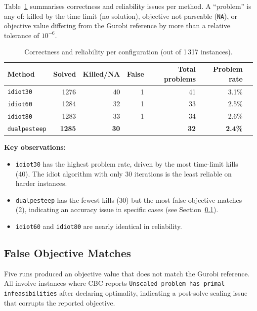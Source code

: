 \documentclass[11pt,a4paper]{article}
\newcommand{\best}[1]{\cellcolor{bestcell}\textbf{#1}}
\newcommand{\bad}[1]{\cellcolor{badcell}{#1}}
\begin{document}
Table~\ref{tab:problems} summarises correctness and reliability issues per method.
A ``problem'' is any of: killed by the time limit (no solution), objective not
parseable (\texttt{NA}), or objective value differing from the Gurobi reference
by more than a relative tolerance of $10^{-6}$.

\begin{table}[h]
\centering
\caption{Correctness and reliability per configuration (out of 1\,317 instances).}
\label{tab:problems}
\begin{tabular}{lrrrrrr}
\toprule
\textbf{Method} & \textbf{Solved} & \textbf{Killed/NA} & \textbf{False} &
\textbf{Total problems} & \textbf{Problem rate} \\
\midrule
\texttt{idiot30}     & 1276 & 40 & 1 & 41 & 3.1\% \\
\texttt{idiot60}     & 1284 & 32 & 1 & 33 & 2.5\% \\
\texttt{idiot80}     & 1283 & 33 & 1 & 34 & 2.6\% \\
\texttt{dualpesteep} & \best{1285} & \best{30} & \bad{2} & \best{32} & \best{2.4\%} \\
\bottomrule
\end{tabular}
\end{table}

\noindent \textbf{Key observations:}
\begin{itemize}
  \item \texttt{idiot30} has the highest problem rate, driven by the most time-limit
        kills (40). The idiot algorithm with only 30 iterations is the least reliable
        on harder instances.
  \item \texttt{dualpesteep} has the fewest kills (30) but the most false objective
        matches (2), indicating an accuracy issue in specific cases (see
        Section~\ref{sec:false}).
  \item \texttt{idiot60} and \texttt{idiot80} are nearly identical in reliability.
\end{itemize}

\subsection{False Objective Matches}
\label{sec:false}

Five runs produced an objective value that does not match the Gurobi reference.
All involve instances where CBC reports \texttt{Unscaled problem has primal
infeasibilities} after declaring optimality, indicating a post-solve scaling
issue that corrupts the reported objective.
\end{document}
